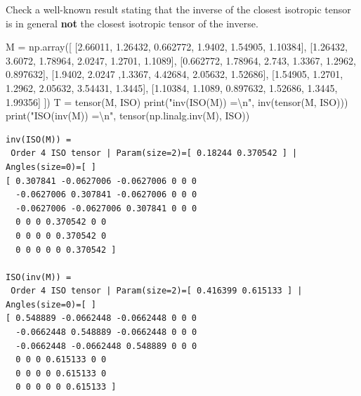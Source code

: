 \documentclass[
  letterpaper,
  DIV=11,
  numbers=noendperiod]{scrreprt}
\newenvironment{Shaded}{\begin{snugshade}}{\end{snugshade}}
\newcommand{\BuiltInTok}[1]{\textcolor[rgb]{0.00,0.23,0.31}{#1}}
\newcommand{\CharTok}[1]{\textcolor[rgb]{0.13,0.47,0.30}{#1}}
\newcommand{\FloatTok}[1]{\textcolor[rgb]{0.68,0.00,0.00}{#1}}
\newcommand{\NormalTok}[1]{\textcolor[rgb]{0.00,0.23,0.31}{#1}}
\newcommand{\OperatorTok}[1]{\textcolor[rgb]{0.37,0.37,0.37}{#1}}
\newcommand{\StringTok}[1]{\textcolor[rgb]{0.13,0.47,0.30}{#1}}
\begin{document}
Check a well-known result stating that the inverse of the closest
isotropic tensor is in general \textbf{not} the closest isotropic tensor
of the inverse.

\begin{Shaded}
\begin{Highlighting}[]
\NormalTok{M }\OperatorTok{=}\NormalTok{ np.array([ [}\FloatTok{2.66011}\NormalTok{, }\FloatTok{1.26432}\NormalTok{, }\FloatTok{0.662772}\NormalTok{, }\FloatTok{1.9402}\NormalTok{, }\FloatTok{1.54905}\NormalTok{, }\FloatTok{1.10384}\NormalTok{],}
\NormalTok{               [}\FloatTok{1.26432}\NormalTok{, }\FloatTok{3.6072}\NormalTok{, }\FloatTok{1.78964}\NormalTok{, }\FloatTok{2.0247}\NormalTok{, }\FloatTok{1.2701}\NormalTok{, }\FloatTok{1.1089}\NormalTok{], }
\NormalTok{               [}\FloatTok{0.662772}\NormalTok{, }\FloatTok{1.78964}\NormalTok{, }\FloatTok{2.743}\NormalTok{, }\FloatTok{1.3367}\NormalTok{, }\FloatTok{1.2962}\NormalTok{, }\FloatTok{0.897632}\NormalTok{], }
\NormalTok{               [}\FloatTok{1.9402}\NormalTok{, }\FloatTok{2.0247}\NormalTok{ ,}\FloatTok{1.3367}\NormalTok{, }\FloatTok{4.42684}\NormalTok{, }\FloatTok{2.05632}\NormalTok{, }\FloatTok{1.52686}\NormalTok{], }
\NormalTok{               [}\FloatTok{1.54905}\NormalTok{, }\FloatTok{1.2701}\NormalTok{, }\FloatTok{1.2962}\NormalTok{, }\FloatTok{2.05632}\NormalTok{, }\FloatTok{3.54431}\NormalTok{, }\FloatTok{1.3445}\NormalTok{], }
\NormalTok{               [}\FloatTok{1.10384}\NormalTok{, }\FloatTok{1.1089}\NormalTok{, }\FloatTok{0.897632}\NormalTok{, }\FloatTok{1.52686}\NormalTok{, }\FloatTok{1.3445}\NormalTok{, }\FloatTok{1.99356}\NormalTok{] ])}
\NormalTok{T }\OperatorTok{=}\NormalTok{ tensor(M, ISO)}
\BuiltInTok{print}\NormalTok{(}\StringTok{"inv(ISO(M)) =}\CharTok{\textbackslash{}n}\StringTok{"}\NormalTok{, inv(tensor(M, ISO)))}
\BuiltInTok{print}\NormalTok{(}\StringTok{"ISO(inv(M)) =}\CharTok{\textbackslash{}n}\StringTok{"}\NormalTok{, tensor(np.linalg.inv(M), ISO))}
\end{Highlighting}
\end{Shaded}

\begin{verbatim}
inv(ISO(M)) =
 Order 4 ISO tensor | Param(size=2)=[ 0.18244 0.370542 ] | Angles(size=0)=[ ]
[ 0.307841 -0.0627006 -0.0627006 0 0 0 
  -0.0627006 0.307841 -0.0627006 0 0 0 
  -0.0627006 -0.0627006 0.307841 0 0 0 
  0 0 0 0.370542 0 0 
  0 0 0 0 0.370542 0 
  0 0 0 0 0 0.370542 ]

ISO(inv(M)) =
 Order 4 ISO tensor | Param(size=2)=[ 0.416399 0.615133 ] | Angles(size=0)=[ ]
[ 0.548889 -0.0662448 -0.0662448 0 0 0 
  -0.0662448 0.548889 -0.0662448 0 0 0 
  -0.0662448 -0.0662448 0.548889 0 0 0 
  0 0 0 0.615133 0 0 
  0 0 0 0 0.615133 0 
  0 0 0 0 0 0.615133 ]
\end{verbatim}
\end{document}
